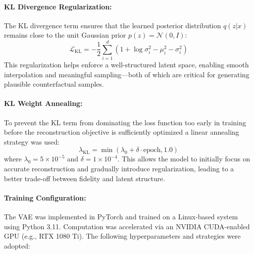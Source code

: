 \paragraph{KL Divergence Regularization:}

The KL divergence term ensures that the learned posterior distribution $q(z|x)$ remains close to the unit Gaussian prior $p(z) = \mathcal{N}(0, I)$:
\[
\mathcal{L}_{\text{KL}} = -\frac{1}{2} \sum_{i=1}^{d} \left(1 + \log\sigma_i^2 - \mu_i^2 - \sigma_i^2\right)
\]
This regularization helps enforce a well-structured latent space, enabling smooth interpolation and meaningful sampling—both of which are critical for generating plausible counterfactual samples.

\paragraph{KL Weight Annealing:}

To prevent the KL term from dominating the loss function too early in training before the reconstruction objective is sufficiently optimized a linear annealing strategy was used:
\[
\lambda_{\text{KL}} = \min(\lambda_0 + \delta \cdot \text{epoch}, 1.0)
\]
where $\lambda_0 = 5 \times 10^{-5}$ and $\delta = 1 \times 10^{-4}$. This allows the model to initially focus on accurate reconstruction and gradually introduce regularization, leading to a better trade-off between fidelity and latent structure.

\paragraph{Training Configuration:}

The VAE was implemented in PyTorch and trained on a Linux-based system using Python 3.11. Computation was accelerated via an NVIDIA CUDA-enabled GPU (e.g., RTX 1080 Ti). The following hyperparameters and strategies were adopted:

